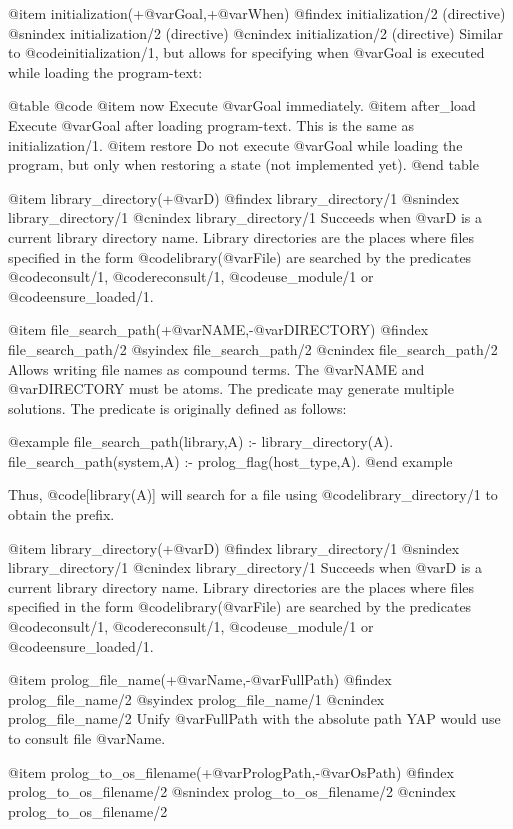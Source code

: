 {{{{@item initialization(+@var{Goal},+@var{When})
@findex initialization/2 (directive)
@snindex initialization/2 (directive)
@cnindex initialization/2 (directive)
Similar to @code{initialization/1}, but allows for specifying when
@var{Goal} is executed while loading the program-text:

@table @code
@item now
    Execute @var{Goal} immediately. 
@item after_load
    Execute @var{Goal} after loading program-text. This is the same as initialization/1. 
@item restore
    Do not execute @var{Goal} while loading the program, but only when
    restoring a state (not implemented yet). 
@end table

@item library_directory(+@var{D})
@findex library_directory/1
@snindex library_directory/1
@cnindex library_directory/1
Succeeds when @var{D} is a current library directory name. Library
directories are the places where files specified in the form
@code{library(@var{File})} are searched by the predicates
@code{consult/1}, @code{reconsult/1}, @code{use_module/1} or
@code{ensure_loaded/1}.

@item file_search_path(+@var{NAME},-@var{DIRECTORY})
@findex file_search_path/2
@syindex file_search_path/2
@cnindex file_search_path/2
Allows writing file names as compound terms. The @var{NAME} and
 @var{DIRECTORY} must be atoms. The predicate may generate multiple
solutions. The predicate is originally defined as follows:

@example
file_search_path(library,A) :-
   library_directory(A).
file_search_path(system,A) :-
   prolog_flag(host_type,A).
@end example

Thus, @code{[library(A)]} will search for a file using
@code{library_directory/1} to obtain the prefix.

@item library_directory(+@var{D})
@findex library_directory/1
@snindex library_directory/1
@cnindex library_directory/1
Succeeds when @var{D} is a current library directory name. Library
directories are the places where files specified in the form
@code{library(@var{File})} are searched by the predicates
@code{consult/1}, @code{reconsult/1}, @code{use_module/1} or
@code{ensure_loaded/1}.

@item prolog_file_name(+@var{Name},-@var{FullPath})
@findex prolog_file_name/2
@syindex prolog_file_name/1
@cnindex prolog_file_name/2
Unify @var{FullPath} with the absolute path YAP would use to consult
file @var{Name}.

@item prolog_to_os_filename(+@var{PrologPath},-@var{OsPath})
@findex prolog_to_os_filename/2
@snindex prolog_to_os_filename/2
@cnindex prolog_to_os_filename/2

}}}}
